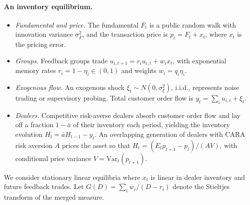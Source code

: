 \documentclass[12pt]{article}
\theoremstyle{definition}
\theoremstyle{remark}
\begin{document}
\paragraph{An inventory equilibrium.}
\begin{itemize}[itemsep=1pt,topsep=2pt]
\item \emph{Fundamental and price.} The fundamental $F_t$ is a public random walk with innovation variance $\sigma_F^2$, and the transaction price is $p_t=F_t+x_t$, where $x_t$ is the pricing error.
\item \emph{Groups.} Feedback groups trade $u_{i,t+1}=r_i u_{i,t}+w_i x_t$, with exponential memory rates $r_i=1-\eta_i\in(0,1)$ and weights $w_i=q_i\eta_i$.
\item \emph{Exogenous flow.} An exogenous shock $\xi_t\sim N(0,\sigma_\xi^2)$, i.i.d., represents noise trading or supervisory probing. Total customer order flow is $y_t=\sum_i u_{i,t}+\xi_t$.
\item \emph{Dealers.} Competitive risk-averse dealers absorb customer order flow and lay off a fraction $1-\bar a$ of their inventory each period, yielding the inventory evolution $H_t=\bar a H_{t-1}-y_t$. An overlapping generation of dealers with CARA risk aversion $A$ prices the asset so that $H_t=(E_t p_{t+1}-p_t)/(A V)$, with conditional price variance $V=\mathrm{Var}_t(p_{t+1})$.
\end{itemize}
We consider stationary linear equilibria where $x_t$ is linear in dealer inventory and future feedback trades. Let $G(D)=\sum_i w_i/(D-r_i)$ denote the Stieltjes transform of the merged measure.
\end{document}
